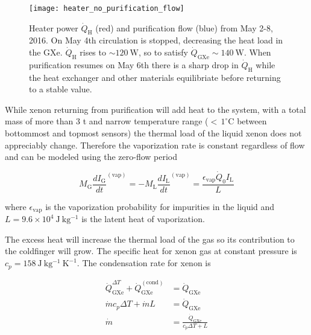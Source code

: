 \begin{figure}
\centering
\texttt{[image: heater\_no\_purification\_flow]}
\caption{Heater power $\dot{Q}_{\mathrm{H}}$ (red) and purification flow (blue) from May 2-8, 2016.  On May 4th circulation is stopped,
decreasing the heat load in the GXe.  $\dot{Q}_{\mathrm{H}}$ rises to ${\sim}120\ \mathrm{W}$, so to satisfy
 $\dot{Q}_{\mathrm{GXe}} \sim 140\ \mathrm{W}$.  When purification resumes on
May 6th there is a sharp drop in $\dot{Q}_{\mathrm{H}}$ while the heat exchanger and other materials equilibriate before returning to a
stable value.}
\label{fig:electron_lifetime_model_vap_and_cond_no_flow}
\end{figure}

While xenon returning from purification will add heat to the system, with a total mass of more than 3 t and narrow temperature range
(${<}\, 1^{\circ}\mathrm{C}$ between bottommost and topmost sensors) the thermal load of the liquid xenon does not
appreciably change.  Therefore the vaporization rate is constant regardless of flow and can be modeled using the zero-flow period

\vspace{-10pt}

\begin{equation}
M_{\mathrm{G}} \frac{dI_{\mathrm{G}}}{dt}^{(\mathrm{vap})} = -M_{\mathrm{L}} \frac{dI_{\mathrm{L}}}{dt}^{(\mathrm{vap})} =
\frac{\epsilon_{\mathrm{vap}} \dot{Q}_0 I_{\mathrm{L}}}{L}
\end{equation}

\noindent where $\epsilon_{\mathrm{vap}}$ is the vaporization probability for impurities in the liquid and
$L = 9.6 \times 10^4\ \mathrm{J\ kg^{-1}}$ is the latent heat of vaporization.

The excess heat will increase the thermal load of the gas so its contribution to the coldfinger will grow.  The specific heat for
xenon gas at constant pressure is $c_p = 158\ \mathrm{J\ kg^{-1}\ K^{-1}}$.  The condensation rate for xenon is

\begin{equation}
\begin{aligned}
\dot{Q}_{\mathrm{GXe}}^{\Delta T} + \dot{Q}_{\mathrm{GXe}}^{(\mathrm{cond})} &= \dot{Q}_{\mathrm{GXe}} \\
\dot{m} c_p \Delta T + \dot{m} L &= \dot{Q}_{\mathrm{GXe}} \\
\dot{m} &= \frac{\dot{Q}_{\mathrm{GXe}}}{c_p \Delta T + L}
\end{aligned}
\end{equation}


